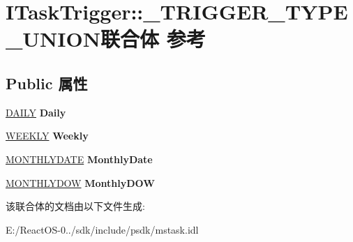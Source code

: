 \hypertarget{union_i_task_trigger_1_1___t_r_i_g_g_e_r___t_y_p_e___u_n_i_o_n}{}\section{I\+Task\+Trigger\+:\+:\+\_\+\+T\+R\+I\+G\+G\+E\+R\+\_\+\+T\+Y\+P\+E\+\_\+\+U\+N\+I\+O\+N联合体 参考}
\label{union_i_task_trigger_1_1___t_r_i_g_g_e_r___t_y_p_e___u_n_i_o_n}
\subsection*{Public 属性}
\begin{DoxyCompactItemize}
\item 
\mbox{\label{union_i_task_trigger_1_1___t_r_i_g_g_e_r___t_y_p_e___u_n_i_o_n_ab78461e78516c0cef43592ce4872ee54}} 
\hyperlink{struct_i_task_trigger_1_1___d_a_i_l_y}{D\+A\+I\+LY} {\bfseries Daily}
\item 
\mbox{\label{union_i_task_trigger_1_1___t_r_i_g_g_e_r___t_y_p_e___u_n_i_o_n_ad63d71b51da5ffb607e85de4f7a4578d}} 
\hyperlink{struct_i_task_trigger_1_1___w_e_e_k_l_y}{W\+E\+E\+K\+LY} {\bfseries Weekly}
\item 
\mbox{\label{union_i_task_trigger_1_1___t_r_i_g_g_e_r___t_y_p_e___u_n_i_o_n_acf2deb27b7dd56b2890290a1ae4678b8}} 
\hyperlink{struct_i_task_trigger_1_1___m_o_n_t_h_l_y_d_a_t_e}{M\+O\+N\+T\+H\+L\+Y\+D\+A\+TE} {\bfseries Monthly\+Date}
\item 
\mbox{\label{union_i_task_trigger_1_1___t_r_i_g_g_e_r___t_y_p_e___u_n_i_o_n_adf9dd092a50a4c5c96df2396ed889a3c}} 
\hyperlink{struct_i_task_trigger_1_1___m_o_n_t_h_l_y_d_o_w}{M\+O\+N\+T\+H\+L\+Y\+D\+OW} {\bfseries Monthly\+D\+OW}
\end{DoxyCompactItemize}


该联合体的文档由以下文件生成\+:\begin{DoxyCompactItemize}
\item 
E\+:/\+React\+O\+S-\/0../sdk/include/psdk/mstask.\+idl\end{DoxyCompactItemize}
